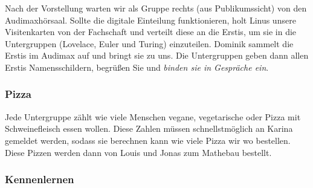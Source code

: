 \documentclass[10pt,twocolumn,ngerman]{scrartcl}
\begin{document}
Nach der Vorstellung warten wir als Gruppe rechts (aus Publikumssicht) von den
Audimaxhörsaal. Sollte die digitale Einteilung funktionieren, holt Linus unsere
Visitenkarten von der Fachschaft und verteilt diese an die Erstis, um sie in
die Untergruppen (Lovelace, Euler und Turing) einzuteilen. Dominik sammelt die
Erstis im Audimax auf und bringt sie zu uns. Die Untergruppen geben dann allen
Erstis Namensschildern, begrüßen Sie und \emph{binden sie in Gespräche ein}.

\subsubsection{Pizza}

Jede Untergruppe zählt wie viele Menschen vegane, vegetarische oder Pizza mit
Schweinefleisch essen wollen. Diese Zahlen müssen schnellstmöglich an Karina
gemeldet werden, sodass sie berechnen kann wie viele Pizza wir wo bestellen.
Diese Pizzen werden dann von Louis und Jonas zum Mathebau bestellt.



\subsubsection{Kennenlernen}
\end{document}
